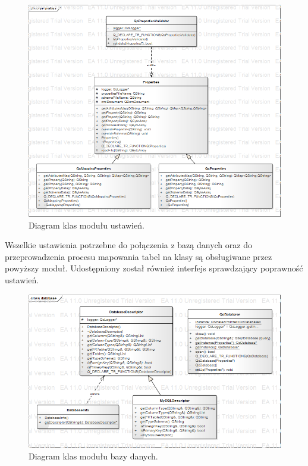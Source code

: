 \documentclass[12pt]{report}
\begin{document}
\begin{figure}[h]
	\centering
	\includegraphics[width=1.1\textwidth]{images/properties.png}
	\caption{Diagram klas modułu ustawień.}
\end{figure}
\FloatBarrier	

Wszelkie ustawienia potrzebne do połączenia z bazą danych oraz do przeprowadzenia procesu mapowania tabel na klasy są obsługiwane przez powyższy moduł. Udostępniony został również interfejs sprawdzający poprawność ustawień.

\begin{figure}[h]
	\centering
	\includegraphics[width=1.1\textwidth]{images/database.png}
	\caption{Diagram klas modułu bazy danych.}
\end{figure}
\FloatBarrier	
\end{document}
